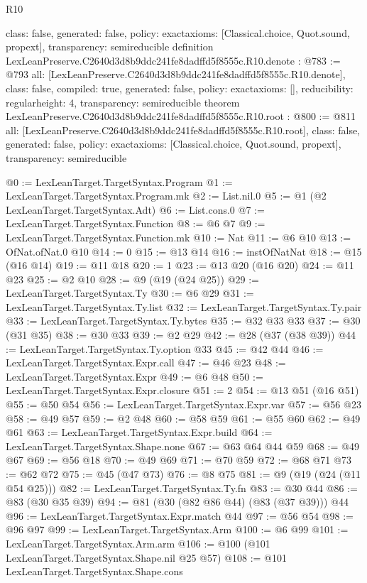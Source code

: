 \begin{lexlean}{R10}
\begin{coremodule}
{  class: false,
  generated: false,
  policy: exact{axioms: [Classical.choice, Quot.sound, propext]},
  transparency: semireducible
}
definition LexLeanPreserve.C2640d3d8b9ddc241fe8dadffd5f8555c.R10.denote : @783 := @793 {
  all: [LexLeanPreserve.C2640d3d8b9ddc241fe8dadffd5f8555c.R10.denote],
  class: false,
  compiled: true,
  generated: false,
  policy: exact{axioms: []},
  reducibility: regular{height: 4},
  transparency: semireducible
}
theorem LexLeanPreserve.C2640d3d8b9ddc241fe8dadffd5f8555c.R10.root : @800 := @811 {
  all: [LexLeanPreserve.C2640d3d8b9ddc241fe8dadffd5f8555c.R10.root],
  class: false,
  generated: false,
  policy: exact{axioms: [Classical.choice, Quot.sound, propext]},
  transparency: semireducible
}

@0 := LexLeanTarget.TargetSyntax.Program
@1 := LexLeanTarget.TargetSyntax.Program.mk
@2 := List.nil.{0}
@5 := @1 (@2 LexLeanTarget.TargetSyntax.Adt)
@6 := List.cons.{0}
@7 := LexLeanTarget.TargetSyntax.Function
@8 := @6 @7
@9 := LexLeanTarget.TargetSyntax.Function.mk
@10 := Nat
@11 := @6 @10
@13 := OfNat.ofNat.{0} @10
@14 := 0
@15 := @13 @14
@16 := instOfNatNat
@18 := @15 (@16 @14)
@19 := @11 @18
@20 := 1
@23 := @13 @20 (@16 @20)
@24 := @11 @23
@25 := @2 @10
@28 := @9 (@19 (@24 @25))
@29 := LexLeanTarget.TargetSyntax.Ty
@30 := @6 @29
@31 := LexLeanTarget.TargetSyntax.Ty.list
@32 := LexLeanTarget.TargetSyntax.Ty.pair
@33 := LexLeanTarget.TargetSyntax.Ty.bytes
@35 := @32 @33 @33
@37 := @30 (@31 @35)
@38 := @30 @33
@39 := @2 @29
@42 := @28 (@37 (@38 @39))
@44 := LexLeanTarget.TargetSyntax.Ty.option @33
@45 := @42 @44
@46 := LexLeanTarget.TargetSyntax.Expr.call
@47 := @46 @23
@48 := LexLeanTarget.TargetSyntax.Expr
@49 := @6 @48
@50 := LexLeanTarget.TargetSyntax.Expr.closure
@51 := 2
@54 := @13 @51 (@16 @51)
@55 := @50 @54
@56 := LexLeanTarget.TargetSyntax.Expr.var
@57 := @56 @23
@58 := @49 @57
@59 := @2 @48
@60 := @58 @59
@61 := @55 @60
@62 := @49 @61
@63 := LexLeanTarget.TargetSyntax.Expr.build
@64 := LexLeanTarget.TargetSyntax.Shape.none
@67 := @63 @64 @44 @59
@68 := @49 @67
@69 := @56 @18
@70 := @49 @69
@71 := @70 @59
@72 := @68 @71
@73 := @62 @72
@75 := @45 (@47 @73)
@76 := @8 @75
@81 := @9 (@19 (@24 (@11 @54 @25)))
@82 := LexLeanTarget.TargetSyntax.Ty.fn
@83 := @30 @44
@86 := @83 (@30 @35 @39)
@94 := @81 (@30 (@82 @86 @44) (@83 (@37 @39))) @44
@96 := LexLeanTarget.TargetSyntax.Expr.match @44
@97 := @56 @54
@98 := @96 @97
@99 := LexLeanTarget.TargetSyntax.Arm
@100 := @6 @99
@101 := LexLeanTarget.TargetSyntax.Arm.arm
@106 := @100 (@101 LexLeanTarget.TargetSyntax.Shape.nil @25 @57)
@108 := @101 LexLeanTarget.TargetSyntax.Shape.cons

\end{coremodule}
\end{lexlean}
